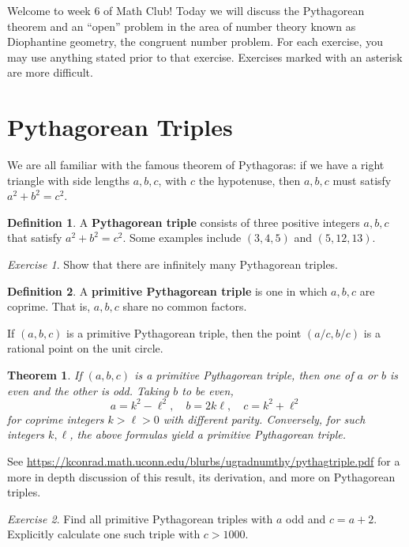 \documentclass{article}
\newtheorem{theorem}{Theorem}%
\theoremstyle{definition}
\newtheorem{definition}{Definition}%
\theoremstyle{remark}
\newtheorem{exercise}{Exercise}
\begin{document}
Welcome to week 6 of Math Club!
Today we will discuss the Pythagorean theorem and an ``open'' problem in the area of number theory known as Diophantine geometry, the congruent number problem.
For each exercise, you may use anything stated prior to that exercise.
Exercises marked with an asterisk are more difficult.

\section{Pythagorean Triples}

We are all familiar with the famous theorem of Pythagoras: if we have a right triangle with side lengths \(a,b,c\), with \(c\) the hypotenuse, then \(a,b,c\) must satisfy \(a^2+b^2=c^2\).

\begin{definition}
	A \textbf{Pythagorean triple} consists of three positive integers \(a,b,c\) that satisfy \(a^2+b^2=c^2\).
	Some examples include \((3,4,5)\) and \((5,12,13)\).
\end{definition}

\begin{exercise}
	Show that there are infinitely many Pythagorean triples.
\end{exercise}

\begin{definition}
	A \textbf{primitive Pythagorean triple} is one in which \(a,b,c\) are coprime.
	That is, \(a,b,c\) share no common factors.
\end{definition}

If \((a,b,c)\) is a primitive Pythagorean triple, then the point \((a/c,b/c)\) is a rational point on the unit circle.

\begin{theorem}
	If \((a,b,c)\) is a primitive Pythagorean triple, then one of \(a\) or \(b\) is even and the other is odd.
	Taking \(b\) to be even, 
	\[a=k^2-\ell^2,\quad b=2k\ell,\quad c=k^2+\ell^2\]
	for coprime integers \(k>\ell>0\) with different parity.
	Conversely, for such integers \(k,\ell\), the above formulas yield a primitive Pythagorean triple.
\end{theorem}

See \url{https://kconrad.math.uconn.edu/blurbs/ugradnumthy/pythagtriple.pdf} for a more in depth discussion of this result, its derivation, and more on Pythagorean triples.

\begin{exercise}
	Find all primitive Pythagorean triples with \(a\) odd and \(c=a+2\).
	Explicitly calculate one such triple with \(c>1000\).
\end{exercise}
\end{document}
